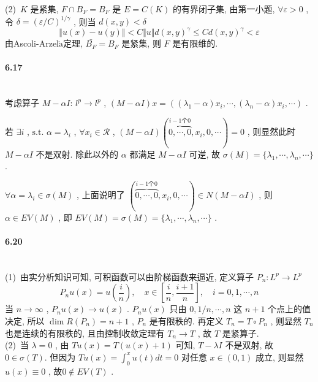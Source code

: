 \documentclass[a4paper, UTF8]{ctexart}				%
\numberwithin{equation}{section}				%
\begin{document}
        \noindent (2) \,$K$ 是紧集, $F \cap B_F = B_F$ 是 $E = C(K)$ 的有界闭子集, 由第一小题, $\forall \varepsilon > 0$ , 令 $\delta = {(\varepsilon/C)}^{1/\gamma}$ , 则当 $d(x, y) < \delta$
        \[
            \Vert{u(x) - u(y)}\Vert < C \Vert{u}\Vert d(x,y)^\gamma \le C d(x,y)^\gamma < \varepsilon
        \]
        由Ascoli-Arzel$\grave{\text{a}}$定理, $\bar{B_F} = B_F$ 是紧集, 则 $F$ 是有限维的.\\

    \paragraph{6.17}\quad\\
        \indent 考虑算子 $M - \alpha I: \, l^p \rightarrow l^p $ , $(M - \alpha I)x = ((\lambda_1 - \alpha)x_i, \cdots, (\lambda_n - \alpha)x_i, \cdots)$ .
        
        若 $\exists i$ , $\text{s.t. } \alpha = \lambda_i $ , $\forall x_i \in \mathcal{R}$ , $(M - \alpha I)(\overbrace{0, \cdots, 0}^{i - 1 \text{个}0}, x_i, 0, \cdots) = 0$ , 则显然此时 $M - \alpha I$ 不是双射. 除此以外的 $\alpha$ 都满足 $M - \alpha I$ 可逆, 故 $\sigma(M) = \{\lambda_1, \cdots, \lambda_n, \cdots\}$ .
        
        $\forall \alpha = \lambda_i \in \sigma(M)$ , 上面说明了 $(\overbrace{0, \cdots, 0}^{i - 1 \text{个}0}, x_i, 0, \cdots) \in N(M - \alpha I)$ , 则 $\alpha \in EV(M)$ , 即 $EV(M) = \sigma(M) = \{\lambda_1, \cdots, \lambda_n, \cdots\}$ .\\

    \paragraph{6.20}\quad\\
        \noindent (1) \,由实分析知识可知, 可积函数可以由阶梯函数来逼近, 定义算子 $P_n: L^p \rightarrow L^p$
        \[
            P_n u(x) = u(\frac{i}{n}), \quad x \in [\frac{i}{n} , \frac{i + 1}{n}], \quad i = 0, 1, \cdots, n
        \]
        当 $n \rightarrow \infty$ , $P_n u(x) \rightarrow u(x)$ . $P_n u(x)$ 只由 $0, 1/n, \cdots, n$ 这 $n + 1$ 个点上的值决定, 所以 $\dim R(P_n) = n + 1$ , $P_n$ 是有限秩的. 再定义 $T_n = T \circ P_n$ , 则显然 $T_n$ 也是连续的有限秩的, 且由控制收敛定理有 $T_n \rightarrow T$ , 故 $T$ 是紧算子.\\

        \noindent (2) \,当 $\lambda = 0$ , 由 $Tu(x) = T(u(x) + 1)$ 可知, $T - \lambda I$ 不是双射, 故 $0 \in \sigma(T)$. 但因为 $Tu(x) = \int^x_0 u(t)dt = 0$ 对任意 $x \in (0, 1)$ 成立, 则显然 $u(x) \equiv 0$ , 故$0 \notin EV(T)$ .
        
\end{document}
